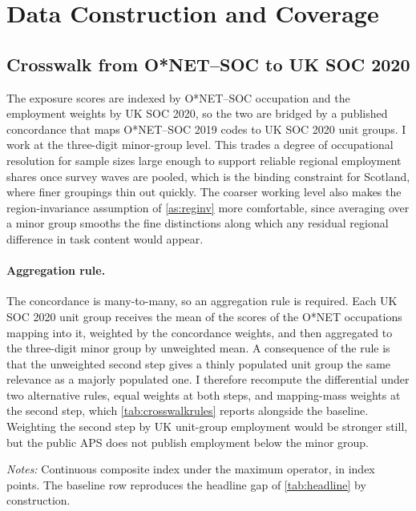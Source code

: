 \section{Data Construction and Coverage}\label{app:data}

\subsection{Crosswalk from O*NET--SOC to UK SOC 2020}

The exposure scores are indexed by O*NET--SOC occupation and the employment weights by UK SOC 2020, so the two are bridged by a published concordance that maps O*NET--SOC 2019 codes to UK SOC 2020 unit groups. I work at the three-digit minor-group level. This trades a degree of occupational resolution for sample sizes large enough to support reliable regional employment shares once survey waves are pooled, which is the binding constraint for Scotland, where finer groupings thin out quickly. The coarser working level also makes the region-invariance assumption of \cref{as:reginv} more comfortable, since averaging over a minor group smooths the fine distinctions along which any residual regional difference in task content would appear.

\paragraph{Aggregation rule.} The concordance is many-to-many, so an aggregation rule is required. Each UK SOC 2020 unit group receives the mean of the scores of the O*NET occupations mapping into it, weighted by the concordance weights, and then aggregated to the three-digit minor group by unweighted mean. A consequence of the rule is that the unweighted second step gives a thinly populated unit group the same relevance as a majorly populated one. I therefore recompute the differential under two alternative rules, equal weights at both steps, and mapping-mass weights at the second step,
which \cref{tab:crosswalkrules} reports alongside the baseline. Weighting the second step by UK unit-group employment would be stronger still, but the public APS does not publish employment below the minor group.

\begin{table}[h]
\centering
\caption{Sensitivity of the differential to the crosswalk aggregation rule}
\label{tab:crosswalkrules}
\small

\begin{minipage}{0.92\textwidth}
\vspace{0.4em}\footnotesize
\textit{Notes:} Continuous composite index under the maximum operator, in index points. The baseline row reproduces the headline gap of \cref{tab:headline} by construction.
\end{minipage}
\end{table}


